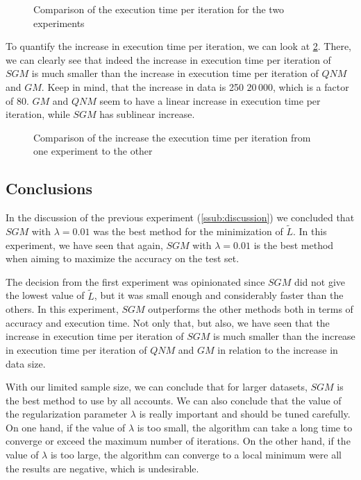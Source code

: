\begin{figure}[H]
    
    \caption{Comparison of the execution time per iteration for the two experiments}
    \label{fig:comp_tex}
\end{figure}

To quantify the increase in execution time per iteration, we can look at
\cref{fig:comp_ratio}. There, we can clearly see that indeed the increase
in execution time per iteration of $SGM$ is much smaller than the increase
in execution time per iteration of $QNM$ and $GM$. Keep in mind, that
the increase in data is 250 \textrightarrow{} $20\,000$, which is a factor of 80.
$GM$ and $QNM$ seem to have a linear increase in execution time per iteration,
while $SGM$ has sublinear increase.

\begin{figure}[H]
    
    \caption{Comparison of the increase the execution time per iteration from one
    experiment to the other}
    \label{fig:comp_ratio}
\end{figure}

%     

\subsection{Conclusions}

In the discussion of the previous experiment (\cref{ssub:discussion}) we concluded that
$SGM$ with $\lambda = 0.01$ was the best method for the minimization of
$\tilde L$. In this experiment, we have seen that again, $SGM$ with $\lambda = 0.01$
is the best method when aiming to maximize the accuracy on the test set.

The decision from the first experiment was opinionated since
$SGM$ did not give the lowest value of $\tilde L$, but it was small enough and
considerably faster than the others. In this experiment, $SGM$ outperforms the other
methods both in terms of accuracy and execution time. Not only that, but also, we have
seen that the increase in execution time per iteration of $SGM$ is much smaller than
the increase in execution time per iteration of $QNM$ and $GM$ in relation to the
increase in data size.

With our limited sample size,
we can conclude that for larger datasets,
$SGM$ is the best method to use by all accounts. We can also conclude that the value
of the regularization parameter $\lambda$ is really important and should be tuned
carefully. On one hand, if the value of $\lambda$ is too small, the algorithm can take a long time
to converge or exceed the maximum number of iterations. On the other hand, if the value
of $\lambda$ is too large, the algorithm can converge to a local minimum were all the results
are negative, which is undesirable.

